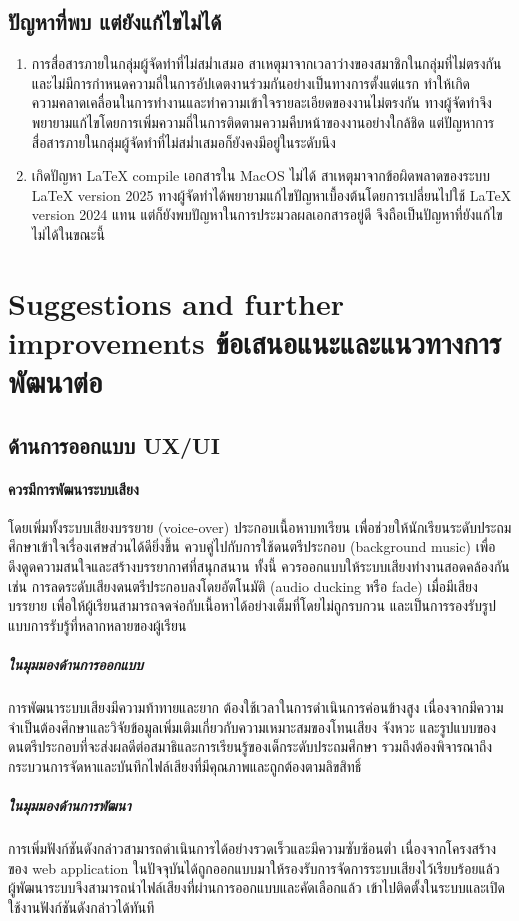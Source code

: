 \subsection*{ปัญหาที่พบ แต่ยังแก้ไขไม่ได้}
\begin{enumerate}
    \item การสื่อสารภายในกลุ่มผู้จัดทำที่ไม่สม่ำเสมอ สาเหตุมาจากเวลาว่างของสมาชิกในกลุ่มที่ไม่ตรงกัน และไม่มีการกำหนดความถี่ในการอัปเดตงานร่วมกันอย่างเป็นทางการตั้งแต่แรก 
    ทำให้เกิดความคลาดเคลื่อนในการทำงานและทำความเข้าใจรายละเอียดของงานไม่ตรงกัน ทางผู้จัดทำจึงพยายามแก้ไขโดยการเพิ่มความถี่ในการติดตามความคืบหน้าของงานอย่างใกล้ชิด 
    แต่ปัญหาการสื่อสารภายในกลุ่มผู้จัดทำที่ไม่สม่ำเสมอก็ยังคงมีอยู่ในระดับนึง
    \item เกิดปัญหา LaTeX compile เอกสารใน MacOS ไม่ได้ สาเหตุมาจากข้อผิดพลาดของระบบ LaTeX version 2025 ทางผู้จัดทำได้พยายามแก้ไขปัญหาเบื้องต้นโดยการเปลี่ยนไปใช้ LaTeX version 2024 แทน 
    แต่ก็ยังพบปัญหาในการประมวลผลเอกสารอยู่ดี จึงถือเป็นปัญหาที่ยังแก้ไขไม่ได้ในขณะนี้
\end{enumerate}

\section{\ifenglish Suggestions and further improvements \else ข้อเสนอแนะและแนวทางการพัฒนาต่อ\fi}

\subsection*{ด้านการออกแบบ UX/UI}
\paragraph{ควรมีการพัฒนาระบบเสียง}
โดยเพิ่มทั้งระบบเสียงบรรยาย (voice-over) ประกอบเนื้อหาบทเรียน เพื่อช่วยให้นักเรียนระดับประถมศึกษาเข้าใจเรื่องเศษส่วนได้ดียิ่งขึ้น 
ควบคู่ไปกับการใช้ดนตรีประกอบ (background music) เพื่อดึงดูดความสนใจและสร้างบรรยากาศที่สนุกสนาน ทั้งนี้ ควรออกแบบให้ระบบเสียงทำงานสอดคล้องกัน เช่น 
การลดระดับเสียงดนตรีประกอบลงโดยอัตโนมัติ (audio ducking หรือ fade) เมื่อมีเสียงบรรยาย เพื่อให้ผู้เรียนสามารถจดจ่อกับเนื้อหาได้อย่างเต็มที่โดยไม่ถูกรบกวน 
และเป็นการรองรับรูปแบบการรับรู้ที่หลากหลายของผู้เรียน
\subparagraph{ในมุมมองด้านการออกแบบ}
การพัฒนาระบบเสียงมีความท้าทายและยาก ต้องใช้เวลาในการดำเนินการค่อนข้างสูง เนื่องจากมีความจำเป็นต้องศึกษาและวิจัยข้อมูลเพิ่มเติมเกี่ยวกับความเหมาะสมของโทนเสียง จังหวะ 
และรูปแบบของดนตรีประกอบที่จะส่งผลดีต่อสมาธิและการเรียนรู้ของเด็กระดับประถมศึกษา รวมถึงต้องพิจารณาถึงกระบวนการจัดหาและบันทึกไฟล์เสียงที่มีคุณภาพและถูกต้องตามลิขสิทธิ์
\subparagraph{ในมุมมองด้านการพัฒนา}
การเพิ่มฟังก์ชันดังกล่าวสามารถดำเนินการได้อย่างรวดเร็วและมีความซับซ้อนต่ำ เนื่องจากโครงสร้างของ web application ในปัจจุบันได้ถูกออกแบบมาให้รองรับการจัดการระบบเสียงไว้เรียบร้อยแล้ว 
ผู้พัฒนาระบบจึงสามารถนำไฟล์เสียงที่ผ่านการออกแบบและคัดเลือกแล้ว เข้าไปติดตั้งในระบบและเปิดใช้งานฟังก์ชันดังกล่าวได้ทันที

